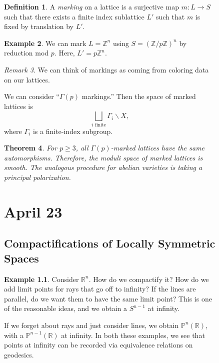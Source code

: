 \documentclass[leqno, openany]{memoir}
\newtheorem{thm}{Theorem}[chapter]
\theoremstyle{definition}
\newtheorem{defn}[thm]{Definition}
\newtheorem{exm}[thm]{Example}
\theoremstyle{remark}
\newtheorem{rmk}[thm]{Remark}
\theoremstyle{plain}
\theoremstyle{definition}
\theoremstyle{remark}
\newcommand{\R}{\mathbb{R}}
\newcommand{\Z}{\mathbb{Z}}
\renewcommand{\P}{\mathbb{P}}
\begin{document}
\begin{figure}[H]
\begin{defn} A \textit{marking} on a lattice is a surjective map $m:L \to S$
such that there exists a finite index sublattice $L'$ such that $m$ is fixed by
translation by $L'$.  \end{defn}

\begin{exm} We can mark $L = \Z^n$ using $S = (\Z/p\Z)^n$ by reduction mod $p$.
Here, $L' = p\Z^n$.  \end{exm}

\begin{rmk} We can think of markings as coming from coloring data on our
lattices.  \end{rmk}

We can consider ``$\Gamma(p)$ markings.'' Then the space of marked lattices is
\[ \bigsqcup_{i \text{ finite}} \Gamma_i \backslash X, \] where $\Gamma_i$ is a
finite-index subgroup.

\begin{thm} For $p \geq 3$, all $\Gamma(p)$-marked lattices have the same
automorphisms. Therefore, the moduli space of marked lattices is smooth. The
analogous procedure for abelian varieties is taking a principal polarization.
\end{thm}

\chapter{April 23}%

\section{Compactifications of Locally Symmetric Spaces}%
\label{sec:compactifications_of_locally_symmetric_spaces}

\begin{exm} Consider $\R^n$. How do we compactify it? How do we add limit
    points for rays that go off to infinity? If the lines are parallel, do we
    want them to have the same limit point? This is one of the reasonable
    ideas, and we obtain a $S^{n-1}$ at infinity.

    If we forget about rays and just consider lines, we obtain $\P^n(\R)$, with
a $\P^{n-1}(\R)$ at infinity. In both these examples, we see that points at
infinity can be recorded via equivalence relations on geodesics.  \end{exm}


\end{figure}
\end{document}
